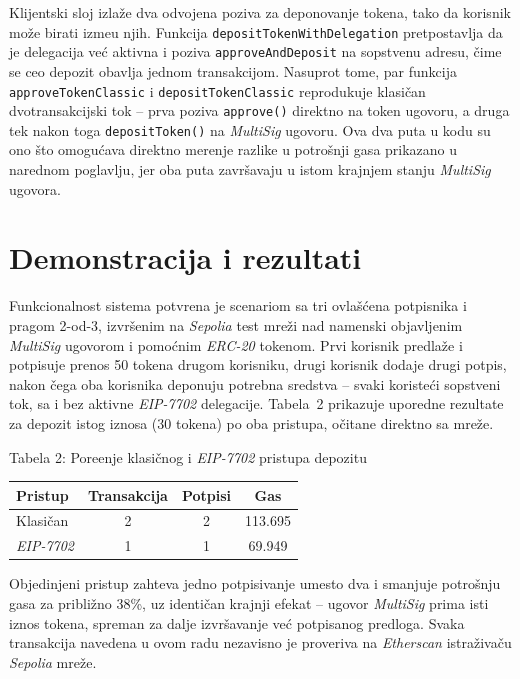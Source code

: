 \documentclass[10pt,a4paper]{article}
\newcommand{\en}[1]{\textit{\textenglish{#1}}}
\begin{document}
Klijentski sloj izla\v ze dva odvojena poziva za deponovanje tokena, tako da korisnik mo\v ze birati izme\dj u njih. Funkcija \texttt{depositTokenWithDelegation} pretpostavlja da je delegacija ve\'c aktivna i poziva \texttt{approveAndDeposit} na sopstvenu adresu, \v cime se ceo depozit obavlja jednom transakcijom. Nasuprot tome, par funkcija \texttt{approveTokenClassic} i \texttt{depositTokenClassic} reprodukuje klasi\v can dvotransakcijski tok -- prva poziva \texttt{approve()} direktno na token ugovoru, a druga tek nakon toga \texttt{depositToken()} na \en{MultiSig} ugovoru. Ova dva puta u kodu su ono \v sto omogu\'cava direktno merenje razlike u potro\v snji gasa prikazano u narednom poglavlju, jer oba puta zavr\v savaju u istom krajnjem stanju \en{MultiSig} ugovora.

\section{Demonstracija i rezultati}

Funkcionalnost sistema potvr\dj ena je scenariom sa tri ovla\v s\'cena potpisnika i pragom 2-od-3, izvr\v senim na \en{Sepolia} test mre\v zi nad namenski objavljenim \en{MultiSig} ugovorom i pomo\'cnim \en{ERC-20} tokenom. Prvi korisnik predla\v ze i potpisuje prenos 50 tokena drugom korisniku, drugi korisnik dodaje drugi potpis, nakon \v cega oba korisnika deponuju potrebna sredstva -- svaki koriste\'ci sopstveni tok, sa i bez aktivne \en{EIP-7702} delegacije. Tabela~2 prikazuje uporedne rezultate za depozit istog iznosa (30 tokena) po oba pristupa, o\v citane direktno sa mre\v ze.

\begin{center}
{\footnotesize Tabela 2: Pore\dj enje klasi\v cnog i \en{EIP-7702} pristupa depozitu}

\vspace{0.2cm}
\small
\begin{tabular}{lccc}
\hline
\textbf{Pristup} & \textbf{Transakcija} & \textbf{Potpisi} & \textbf{Gas} \\
\hline
Klasi\v can & 2 & 2 & 113.695 \\
\en{EIP-7702} & 1 & 1 & 69.949 \\
\hline
\end{tabular}
\end{center}

Objedinjeni pristup zahteva jedno potpisivanje umesto dva i smanjuje potro\v snju gasa za pribli\v zno 38\%, uz identi\v can krajnji efekat -- ugovor \en{MultiSig} prima isti iznos tokena, spreman za dalje izvr\v savanje ve\'c potpisanog predloga. Svaka transakcija navedena u ovom radu nezavisno je proveriva na \en{Etherscan} istra\v ziva\v cu \en{Sepolia} mre\v ze.
\end{document}
